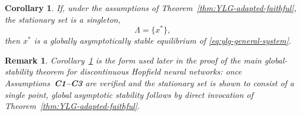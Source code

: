 \documentclass[journal]{IEEEtran}
\newtheorem{corollary}{Corollary}
\newtheorem{assumption}{Assumption}
\newtheorem{remark}{Remark}
\begin{document}
\begin{corollary}
\label{cor:YLG-singleton}
If, under the assumptions of
Theorem~\ref{thm:YLG-adapted-faithful}, the stationary set is a singleton,
\[
  \Lambda=\{x^\ast\},
\]
then \(x^\ast\) is a globally asymptotically stable equilibrium of
\eqref{eq:ylg-general-system}.
\end{corollary}

\begin{remark}
Corollary~\ref{cor:YLG-singleton} is the form used later in the proof of the
main global-stability theorem for discontinuous Hopfield neural networks:
once Assumptions~\textbf{C1--C3} are verified and the stationary set is shown to consist
of a single point, global asymptotic stability follows by direct invocation of
Theorem~\ref{thm:YLG-adapted-faithful}.
\end{remark}




\end{document}
